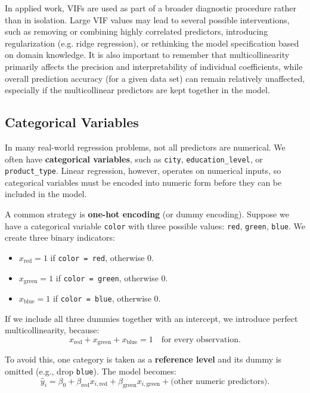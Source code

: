 In applied work, VIFs are used as part of a broader diagnostic procedure rather than in isolation. Large VIF values may lead to several possible interventions, such as removing or combining highly correlated predictors, introducing regularization (e.g. ridge regression), or rethinking the model specification based on domain knowledge. It is also important to remember that multicollinearity primarily affects the precision and interpretability of individual coefficients, while overall prediction accuracy (for a given data set) can remain relatively unaffected, especially if the multicollinear predictors are kept together in the model.


\subsection{Categorical Variables}

In many real-world regression problems, not all predictors are numerical. We often have \textbf{categorical variables}, such as \texttt{city}, \texttt{education\_level}, or \texttt{product\_type}. Linear regression, however, operates on numerical inputs, so categorical variables must be encoded into numeric form before they can be included in the model.

A common strategy is \textbf{one-hot encoding} (or dummy encoding). Suppose we have a categorical variable \texttt{color} with three possible values: \texttt{red}, \texttt{green}, \texttt{blue}. We create three binary indicators:
\begin{itemize}
  \item $x_{\text{red}} = 1$ if \texttt{color = red}, otherwise $0$.
  \item $x_{\text{green}} = 1$ if \texttt{color = green}, otherwise $0$.
  \item $x_{\text{blue}} = 1$ if \texttt{color = blue}, otherwise $0$.
\end{itemize}

If we include all three dummies together with an intercept, we introduce perfect multicollinearity, because:
\[
x_{\text{red}} + x_{\text{green}} + x_{\text{blue}} = 1 \quad \text{for every observation.}
\]

To avoid this, one category is taken as a \textbf{reference level} and its dummy is omitted (e.g., drop \texttt{blue}). The model becomes:
\[
\hat{y}_i = \beta_0
          + \beta_{\text{red}} x_{i,\text{red}}
          + \beta_{\text{green}} x_{i,\text{green}}
          + \text{(other numeric predictors)}.
\]


